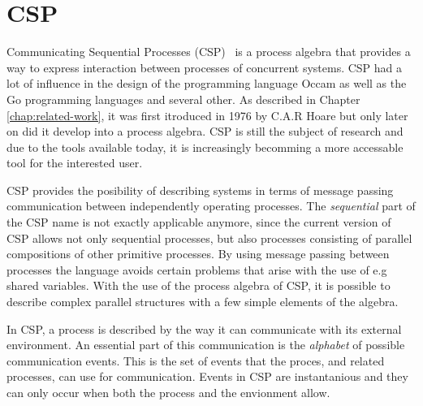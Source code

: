 \newpage
\section{CSP}
\label{sec:csp_background}
Communicating Sequential Processes (CSP)~\cite{Hoare1978} is a process algebra that provides a way to express interaction between processes of concurrent systems.
CSP had a lot of influence in the design of the programming language Occam as well as the Go programming languages and several other. As described in Chapter \ref{chap:related-work}, it was first itroduced in 1976 by C.A.R Hoare but only later on did it develop into a process algebra. CSP is still the subject of research and due to the tools available today, it is increasingly becomming a more accessable tool for the interested user.

CSP provides the posibility of describing systems in terms of message passing communication between independently operating processes. The \textit{sequential} part of the CSP name is not exactly applicable anymore, since the current version of CSP allows not only sequential processes, but also processes consisting of parallel compositions of other primitive processes.
By using message passing between processes the language avoids certain problems that arise with the use of e.g shared variables.
With the use of the process algebra of CSP, it is possible to describe complex
parallel structures with a few simple elements of the algebra.

In CSP, a process is described by the way it can communicate with its external environment. An essential part of this communication is the \textit{alphabet} of possible communication events. This is the set of events that the proces, and related processes, can use for communication. Events in CSP are instantanious and they can only occur when both the process and the envionment allow.

